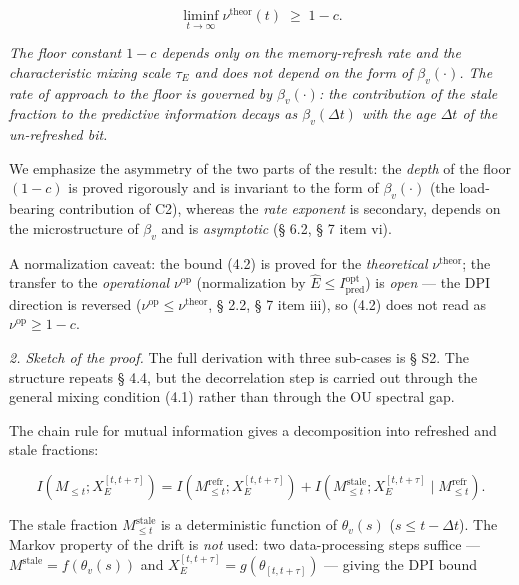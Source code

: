 \documentclass[12pt]{iopart}
\begin{document}
\begin{equation}\liminf_{t\to\infty}\nu^{\text{theor}}(t) \;\ge\; 1 - c. \tag{4.2}\end{equation}



\emph{The floor constant \(1-c\) depends only on the memory-refresh rate and the characteristic mixing scale \(\tau_E\) and does not depend on the form of \(\beta_v(\cdot)\). The rate of approach to the floor is governed by \(\beta_v(\cdot)\): the contribution of the stale fraction to the predictive information decays as \(\beta_v(\Delta t)\) with the age \(\Delta t\) of the un-refreshed bit.}



We emphasize the asymmetry of the two parts of the result: the \emph{depth} of the floor \((1-c)\) is proved rigorously and is invariant to the form of \(\beta_v(\cdot)\) (the load-bearing contribution of C2), whereas the \emph{rate exponent} is secondary, depends on the microstructure of \(\beta_v\) and is \emph{asymptotic} (§ 6.2, § 7 item vi).



A normalization caveat: the bound (4.2) is proved for the \emph{theoretical} \(\nu^{\text{theor}}\); the transfer to the \emph{operational} \(\nu^{\text{op}}\) (normalization by \(\hat E \le I_{\text{pred}}^{\text{opt}}\)) is \emph{open} --- the DPI direction is reversed (\(\nu^{\text{op}} \le \nu^{\text{theor}}\), § 2.2, § 7 item iii), so (4.2) does not read as \(\nu^{\text{op}} \ge 1-c\).



\emph{2. Sketch of the proof.} The full derivation with three sub-cases is § S2. The structure repeats \cite{Andriishin2026b} § 4.4, but the decorrelation step is carried out through the general mixing condition (4.1) rather than through the OU spectral gap.



The chain rule for mutual information gives a decomposition into refreshed and stale fractions:



\[I(M_{\le t}; X_E^{[t,t+\tau]}) = I(M_{\le t}^{\text{refr}}; X_E^{[t,t+\tau]}) + I(M_{\le t}^{\text{stale}}; X_E^{[t,t+\tau]}\mid M_{\le t}^{\text{refr}}).\]



The stale fraction \(M_{\le t}^{\text{stale}}\) is a deterministic function of \(\theta_v(s)\) (\(s \le t - \Delta t\)). The Markov property of the drift is \emph{not} used: two data-processing steps suffice --- \(M^{\text{stale}} = f(\theta_v(s))\) and \(X_E^{[t,t+\tau]} = g(\theta_{[t,t+\tau]})\) --- giving the DPI bound
\end{document}
